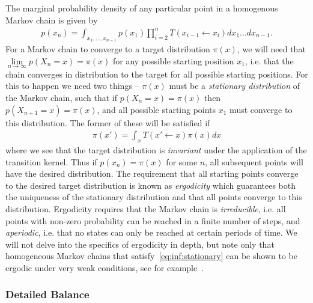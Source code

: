 The marginal probability density of any particular point in a homogenous Markov chain is given by
\begin{align}
p(x_n) = \int_{x_1,\dots,x_{n-1}} p(x_1) \prod_{i=2}^{n} T(x_{i-1} \leftarrow x_{i}) dx_1\dots dx_{n-1}.
\end{align}
 For a Markov chain to converge to a target distribution $\pi (x)$, we will need that
$\lim\limits_{n\rightarrow\infty} p(X_n=x) = \pi(x)$ for any possible starting position $x_1$, i.e.
that the chain converges in distribution to the target for all possible starting positions.   For this
to happen we need two things -- $\pi(x)$ must be a \emph{stationary distribution} of the Markov
chain, such that if $p(X_n=x) = \pi(x)$ then $p(X_{n+1}=x) = \pi(x)$, and all possible starting points
$x_1$ must converge to this distribution.  The former of these will be satisfied if 
\begin{align}
\label{eq:inf:stationary}
\pi(x') = \int_{x} T(x' \leftarrow x) \pi(x)dx
\end{align}
where we see that the target distribution is \emph{invariant} under the application of the transition kernel.
Thus if $p(x_n)=\pi(x)$ for some $n$, all subsequent points will have the desired distribution.
The requirement that all starting points converge to the desired target distribution is known
as \emph{ergodicity} which guarantees both the uniqueness of the stationary distribution
and that all points converge to this distribution.  Ergodicity requires that the Markov chain is
\emph{irreducible}, i.e. all points with non-zero probability can be reached in a finite number
of steps, and \emph{aperiodic}, i.e. that no states can only be reached at certain periods of 
time.   We will not delve into the specifics of ergodicity in depth, but note only that homogeneous
Markov chains that satisfy~\eqref{eq:inf:stationary} can be shown to be ergodic under very weak
conditions, see for example~\cite{neal1993probabilistic,tierney1994markov}.

\subsubsection{Detailed Balance}
\label{sec:inf:foundation:mcmc:db}

